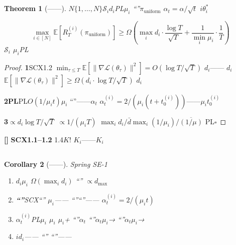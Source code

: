 \documentclass[11pt,a4paper]{article}
\newtheorem{theorem}{Theorem}[section]
\newtheorem{corollary}[theorem]{Corollary}
\theoremstyle{remark}
\newcommand{\Sstates}{\mathcal{S}}
\newcommand{\E}{\mathbb{E}}
\newcommand{\rigorous}{\textnormal{\textbf{[]}}}
\begin{document}
\subsection{}

\begin{theorem}[——]
\label{thm:individualized}
$N$$\{1, \ldots, N\}$$\Sstates_i$$d_i$PL$\mu_i$
``''$\pi_{\text{uniform}}$
$\alpha_t = \alpha / \sqrt{t}$
$i$$\theta_i^*$

\begin{equation}
    \boxed{
    \max_{i \in [N]} \mathbb{E}[R_T^{(i)}(\pi_{\text{uniform}})]
    \geq \Omega\!\left(\max_i d_i \cdot \frac{\log T}{\sqrt{T}} + \frac{1}{\min_i \mu_i} \cdot \frac{1}{T}\right)
    }
\end{equation}
\textbf{}$\Sstates_i$\textbf{}
$\mu_i$PL
\end{theorem}

\begin{proof}
\textbf{1}SCX1.2
$\min_{\tau \leq T} \E[\|\nabla\mathcal{L}(\theta_\tau)\|^2] = O(\log T / \sqrt{T})$
$d_i$——
$d_i$
$\E[\|\nabla\mathcal{L}(\theta_\tau)\|^2] \geq \Omega(d_i \cdot \log T / \sqrt{T})$
$d_i$

\textbf{2PL}PL$O(1/\mu_i t)$$\mu_i$
``''——$\alpha_t$
$\alpha_t^{(i)} = 2/(\mu_i(t+t_0^{(i)}))$——$\mu_i$$t_0^{(i)}$

\textbf{3}$\propto d_i \log T / \sqrt{T}$
$\propto 1/(\mu_i T)$
$\max_i d_i / \bar{d}$$\max_i (1/\mu_i) / \overline{(1/\mu)}$
PL\hfill $\square$
\end{proof}

\rigorous{} \textbf{SCX1.1--1.2
}1.4$K!$
$K_i$——$K_i$

\subsection{}

\begin{corollary}[——]
\label{cor:individualized}
Spring SE-1

\begin{enumerate}[label=(\arabic*)]
    \item \textbf{}$d_i$$\mu_i$
          $\Omega(\max_i d_i)$
          ``''
          $\propto d_{\max}$
    \item \textbf{``''}SCX``''
          $\mu_i$——
          ``''``''——
          $\alpha_t^{(i)} = 2/(\mu_i t)$
    \item \textbf{}$\alpha_t^{(i)}$PL$\mu_i$
          $\mu_i$
          $\mu_i$+
          ``''$\alpha_t$
          ``''$\alpha_t$$\mu_i$→
          ``''$\alpha_t$$\mu_i$→
    \item \textbf{}$i$$d_i$——
          ``''
          ``''——
          
\end{enumerate}
\end{corollary}
\end{document}
